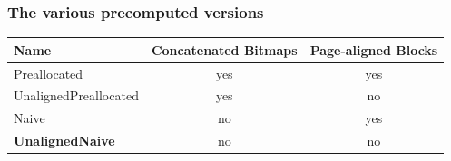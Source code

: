 \documentclass{beamer}
\begin{document}


\begin{frame}
\frametitle{The various precomputed versions}
\begin{tabular}{|lcc|}
\hline
Name						& Concatenated Bitmaps	& Page-aligned Blocks	\\ \hline
Preallocated				& yes					& yes					\\ \hline
UnalignedPreallocated	& yes					& no						\\ \hline
Naive					& no						& yes					\\ \hline
\textbf{UnalignedNaive}			& no						& no						\\ \hline
\end{tabular}\\
\end{frame}
\end{document}
